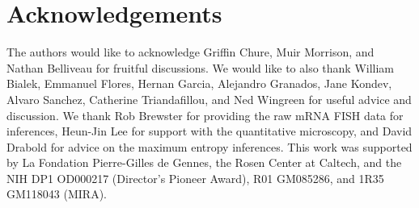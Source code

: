 \section*{Acknowledgements}

The authors would like to acknowledge Griffin Chure, Muir Morrison, and Nathan
Belliveau for fruitful discussions.
We would like to also thank William Bialek, Emmanuel Flores, Hernan Garcia,
Alejandro Granados, Jane Kondev, Alvaro Sanchez, Catherine Triandafillou, and
Ned Wingreen for useful advice and discussion.
We thank Rob Brewster for providing the raw mRNA FISH data for inferences,
Heun-Jin Lee for support with the quantitative microscopy, and David Drabold
for advice on the maximum entropy inferences.
This work was supported by La Fondation Pierre-Gilles de Gennes, the Rosen
Center at Caltech, and the NIH DP1 OD000217 (Director’s Pioneer Award), R01
GM085286, and 1R35 GM118043 (MIRA).
